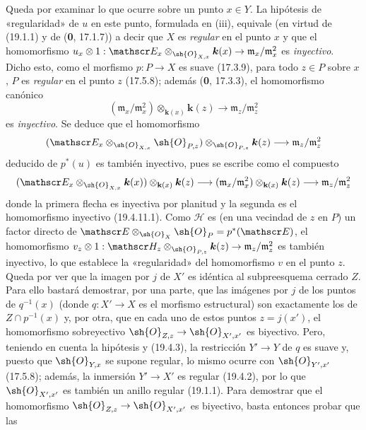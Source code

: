 Queda por examinar lo que ocurre sobre un punto $x\in Y$. La hipótesis de «regularidad» de $u$ en este punto, formulada en (iii), equivale (en virtud de (19.1.1) y de (\textbf{0}, 17.1.7)) a decir que $X$ es \emph{regular} en el punto $x$ y que el homomorfismo
$u_x\otimes1:\mathscr E_x\otimes_{\sh{O}_{X,x}}\boldsymbol{k}(x)\to\mathfrak m_x/\mathfrak m_x^2$
es \emph{inyectivo}. Dicho esto, como el morfismo $p:P\to X$ es suave (17.3.9), para todo $z\in P$ sobre $x$, $P$ es \emph{regular} en el punto $z$ (17.5.8); además (\textbf{0}, 17.3.3), el homomorfismo canónico
\begin{equation}
  (\mathfrak m_x/\mathfrak m_x^2)\otimes_{\mathbf k(x)}\boldsymbol{k}(z)\longrightarrow\mathfrak m_z/\mathfrak m_z^2
  \tag{19.4.11.1}\label{IV.19.4.11.1}
\end{equation}
es \emph{inyectivo}. Se deduce que el homomorfismo
\[
  (\mathscr E_x\otimes_{\sh{O}_{X,x}}\sh{O}_{P,z})\otimes_{\sh{O}_{P,z}}\boldsymbol{k}(z)\longrightarrow\mathfrak m_z/\mathfrak m_z^2
\]
deducido de $p^*(u)$ es también inyectivo, pues se escribe como el compuesto
\[
  (\mathscr E_x\otimes_{\sh{O}_{X,x}}\boldsymbol{k}(x))\otimes_{\mathbf k(x)}\boldsymbol{k}(z)\longrightarrow(\mathfrak m_x/\mathfrak m_x^2)\otimes_{\mathbf k(x)}\boldsymbol{k}(z)\longrightarrow\mathfrak m_z/\mathfrak m_z^2
\]
donde la primera flecha es inyectiva por planitud y la segunda es el homomorfismo inyectivo (19.4.11.1). Como $\mathscr H$ es (en una vecindad de $z$ en $P$) un factor directo de $\mathscr E\otimes_{\sh{O}_X}\sh{O}_P=p^*(\mathscr E)$, el homomorfismo $v_z\otimes1:\mathscr H_z\otimes_{\sh{O}_{P,z}}\boldsymbol{k}(z)\to\mathfrak m_z/\mathfrak m_z^2$ es también inyectivo, lo que establece la «regularidad» del homomorfismo $v$ en el punto $z$. Queda por ver que la imagen por $j$ de $X'$ es idéntica al subpreesquema cerrado $Z$. Para ello bastará demostrar, por una parte, que las imágenes por $j$ de los puntos de $q^{-1}(x)$ (donde $q:X'\to X$ es el morfismo estructural) son exactamente los de $Z\cap p^{-1}(x)$ y, por otra, que en cada uno de estos puntos $z=j(x')$, el homomorfismo sobreyectivo $\sh{O}_{Z,z}\to\sh{O}_{X',x'}$ es biyectivo. Pero, teniendo en cuenta la hipótesis y (19.4.3), la restricción $Y'\to Y$ de $q$ es suave y, puesto que $\sh{O}_{Y,x}$ se supone regular, lo mismo ocurre con $\sh{O}_{Y',x'}$ (17.5.8); además, la inmersión $Y'\to X'$ es regular (19.4.2), por lo que $\sh{O}_{X',x'}$ es también un anillo regular (19.1.1). Para demostrar que el homomorfismo $\sh{O}_{Z,z}\to\sh{O}_{X',x'}$ es biyectivo, basta entonces probar que las

